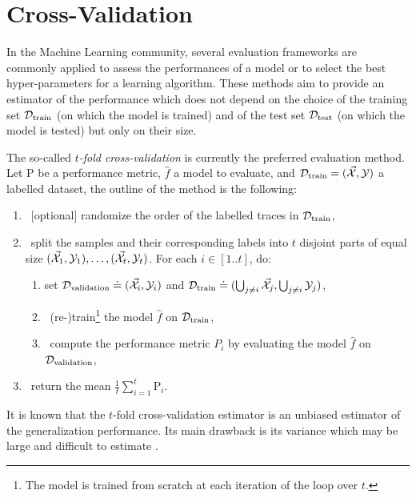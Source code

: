 \chapter{Cross-Validation} 

\label{app:cross-validation} 

In the Machine Learning community, several evaluation frameworks are commonly
applied to assess the performances of a model or to select the best hyper-parameters
for a learning algorithm. These methods aim to provide an
estimator of the performance which does not
depend on the choice of the training set $\mathcal{D}_{\text{train}}$ (on which the model is trained) and of the
test set $\mathcal{D}_{\text{test}}$ (on which the model is tested) but only on their size.

The so-called \emph{$t$-fold
cross-validation} \cite{friedman2001elements} is currently the preferred evaluation method. Let P be a
performance metric, $\hat{f}$ a model to evaluate, and $\mathcal{D}_{\text{train}}=(\vec{\mathcal{X}}, \mathcal{Y})$ a labelled dataset, the outline of the method is the
following: 
\begin{enumerate}
\item ~[optional] randomize the order of the labelled traces in $\mathcal{D}_{\text{train}}$, 
\item ~split the samples and their corresponding labels into $t$ disjoint parts
of equal size $(\vec{\mathcal{X}}_1,\mathcal{Y}_1),\ldots,(\vec{\mathcal{X}}_t,\mathcal{Y}_t)$.
For each $i\in [1..t]$, do:
\begin{enumerate}
\item set $\mathcal{D}_{\text{validation}} \doteq (\vec{\mathcal{X}}_i, \mathcal{Y}_i)$ and
$\mathcal{D}_{\text{train}} \doteq (\bigcup_{j\neq i} \vec{\mathcal{X}}_j, \bigcup_{j\neq
i} \mathcal{Y}_j)$,
\item ~(re-)train\footnote{The model is trained from scratch at each iteration of the loop over $t$.} the model $\hat{f}$ on $\mathcal{D}_{\text{train}}$, 
\item ~compute the performance metric $P_i$ by evaluating the model $\hat{f}$ on $\mathcal{D}_{\text{validation}}$,
\end{enumerate}
\item ~return the mean $\frac{1}{t}\sum_{i=1}^t \text{P}_i$.
\end{enumerate}

It is known that the $t$-fold cross-validation estimator is an unbiased
estimator of the generalization performance. Its main drawback is its variance
which may be large and difficult to estimate
\cite{breiman1996heuristics,bengio2005bias}. 